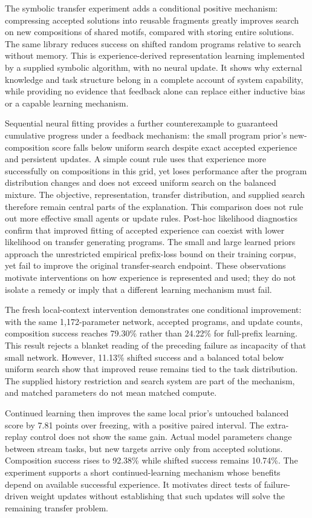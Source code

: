 \documentclass[11pt]{article}
\begin{document}
The symbolic transfer experiment adds a conditional positive mechanism:
compressing accepted solutions into reusable fragments greatly improves search
on new compositions of shared motifs, compared with storing entire solutions.
The same library reduces success on shifted random programs relative to
search without memory. This is experience-derived representation learning
implemented by a supplied symbolic algorithm, with no neural update. It shows
why external knowledge and task structure belong in a complete account of
system capability, while providing no evidence that feedback alone can replace
either inductive bias or a capable learning mechanism.

Sequential neural fitting provides a further counterexample to guaranteed
cumulative progress under a feedback mechanism: the small program prior's
new-composition score falls below uniform search despite exact accepted
experience and persistent updates. A simple count rule uses that experience
more successfully on compositions in this grid, yet loses performance after
the program distribution changes and does not exceed uniform search on the
balanced mixture. The objective, representation, transfer distribution, and
supplied search therefore remain central parts of the explanation. This
comparison does not rule out more effective small agents or update rules.
Post-hoc likelihood diagnostics confirm that improved fitting of accepted
experience can coexist with lower likelihood on transfer generating programs.
The small and large learned priors approach the unrestricted empirical
prefix-loss bound on their training corpus, yet fail to improve the original
transfer-search endpoint. These observations motivate interventions on how
experience is represented and used; they do not isolate a remedy or imply
that a different learning mechanism must fail.

The fresh local-context intervention demonstrates one conditional improvement:
with the same 1,172-parameter network, accepted programs, and update counts,
composition success reaches 79.30\% rather than 24.22\% for full-prefix
learning. This result rejects a blanket reading of the preceding failure as
incapacity of that small network. However, 11.13\% shifted success and a
balanced total below uniform search show that improved reuse remains tied
to the task distribution. The supplied history restriction and search system
are part of the mechanism, and matched parameters do not mean matched compute.

Continued learning then improves the same local prior's untouched balanced
score by 7.81 points over freezing, with a positive paired interval. The
extra-replay control does not show the same gain. Actual model parameters
change between stream tasks, but new targets arrive only from accepted
solutions. Composition success rises to 92.38\% while shifted success remains
10.74\%. The experiment supports a short continued-learning mechanism whose
benefits depend on available successful experience. It motivates direct tests
of failure-driven weight updates without establishing that such updates will
solve the remaining transfer problem.
\end{document}

